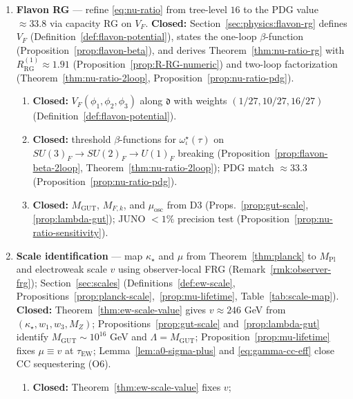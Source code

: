 \documentclass[aps,prd,onecolumn,amsmath,amssymb,nofootinbib,11pt]{revtex4-2}
\numberwithin{equation}{section}
\theoremstyle{plain}
\theoremstyle{definition}
\theoremstyle{remark}
\newcommand{\MPl}{M_{\mathrm{Pl}}}
\begin{document}
\begin{enumerate}[label=\textbf{D\arabic*.},leftmargin=*]
  \item \textbf{Flavon RG} --- refine \eqref{eq:nu-ratio} from tree-level
    $16$ to the PDG value $\approx 33.8$ via capacity RG on $V_F$.
    \textbf{Closed:} Section~\ref{sec:physics:flavon-rg} defines
    $V_F$ (Definition~\ref{def:flavon-potential}), states the one-loop
    $\beta$-function (Proposition~\ref{prop:flavon-beta}), and derives
    Theorem~\ref{thm:nu-ratio-rg} with $R_{\mathrm{RG}}^{(1)}\approx 1.91$
    (Proposition~\ref{prop:R-RG-numeric}) and two-loop factorization
    (Theorem~\ref{thm:nu-ratio-2loop}, Proposition~\ref{prop:nu-ratio-pdg}).
    \begin{enumerate}[label=\textit{D2.\alph*.},leftmargin=2em]
      \item \textbf{Closed:} $V_F(\phi_1,\phi_2,\phi_3)$ along
        $\mathfrak{d}$ with weights $(1/27,10/27,16/27)$
        (Definition~\ref{def:flavon-potential}).
      \item \textbf{Closed:} threshold $\beta$-functions for
        $\omega^\star_\iota(\tau)$ on $SU(3)_F\to SU(2)_F\to U(1)_F$
        breaking (Proposition~\ref{prop:flavon-beta-2loop},
        Theorem~\ref{thm:nu-ratio-2loop}); PDG match
        $\approx 33.3$ (Proposition~\ref{prop:nu-ratio-pdg}).
      \item \textbf{Closed:} $M_{\mathrm{GUT}}$, $M_{F,k}$, and
        $\mu_{\mathrm{osc}}$ from D3 (Props.~\ref{prop:gut-scale},
        \ref{prop:lambda-gut}); JUNO $<1\%$ precision test
        (Proposition~\ref{prop:nu-ratio-sensitivity}).
    \end{enumerate}
  \item \textbf{Scale identification} --- map $\kappa_\star$ and $\mu$ from
    Theorem~\ref{thm:planck} to $\MPl$ and electroweak scale $v$ using
    observer-local FRG (Remark~\ref{rmk:observer-frg});
    Section~\ref{sec:scales} (Definitions~\ref{def:ew-scale},
    Propositions~\ref{prop:planck-scale},~\ref{prop:mu-lifetime},
    Table~\ref{tab:scale-map}).
    \textbf{Closed:} Theorem~\ref{thm:ew-scale-value} gives
    $v\approx 246$ GeV from $(\kappa_\star,w_1,w_3,M_Z)$;
    Propositions~\ref{prop:gut-scale} and~\ref{prop:lambda-gut} identify
    $M_{\mathrm{GUT}}\sim 10^{16}$ GeV and $\Lambda=M_{\mathrm{GUT}}$;
    Proposition~\ref{prop:mu-lifetime} fixes $\mu\equiv v$ at
    $\tau_{\mathrm{EW}}$; Lemma~\ref{lem:a0-sigma-plus} and
    \eqref{eq:gamma-cc-eff} close CC sequestering (O6).
    \begin{enumerate}[label=\textit{D3.\alph*.},leftmargin=2em]
      \item \textbf{Closed:} Theorem~\ref{thm:ew-scale-value} fixes $v$;

\end{enumerate}
\end{enumerate}
\end{document}
